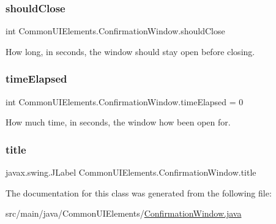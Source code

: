 \subsubsection{\texorpdfstring{should\+Close}{shouldClose}}
{\footnotesize\ttfamily int Common\+U\+I\+Elements.\+Confirmation\+Window.\+should\+Close\hspace{0.3cm}{\ttfamily [private]}}



How long, in seconds, the window should stay open before closing. 

\mbox{\label{classCommonUIElements_1_1ConfirmationWindow_a74e97a157709ec31ca3f48ff124c210c}} 
\subsubsection{\texorpdfstring{time\+Elapsed}{timeElapsed}}
{\footnotesize\ttfamily int Common\+U\+I\+Elements.\+Confirmation\+Window.\+time\+Elapsed = 0\hspace{0.3cm}{\ttfamily [private]}}



How much time, in seconds, the window how been open for. 

\mbox{\label{classCommonUIElements_1_1ConfirmationWindow_af03f991bc2c55d19a2507a54a20b6ab6}} 
\subsubsection{\texorpdfstring{title}{title}}
{\footnotesize\ttfamily javax.\+swing.\+J\+Label Common\+U\+I\+Elements.\+Confirmation\+Window.\+title\hspace{0.3cm}{\ttfamily [private]}}



The documentation for this class was generated from the following file\+:\begin{DoxyCompactItemize}
\item 
src/main/java/\+Common\+U\+I\+Elements/\hyperlink{ConfirmationWindow_8java}{Confirmation\+Window.\+java}\end{DoxyCompactItemize}
